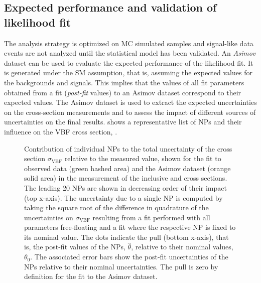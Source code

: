 \subsection{Expected performance and validation of likelihood fit}
The analysis strategy is optimized on MC simulated samples and signal-like data events are not analyzed until the statistical model has been validated.
An \emph{Asimov} dataset can be used to evaluate the expected performance of the likelihood fit. It is generated under the SM assumption, that is, assuming the expected values for the backgrounds and signals. 
This implies that the values of all fit parameters obtained from a fit (\emph{post-fit} values) to an Asimov dataset correspond to their expected values. 
The Asimov dataset is used to extract the expected uncertainties on the cross-section measurements and to assess the impact of different sources of uncertainties on the final results. 
 shows a representative list of NPs and their influence on the VBF cross section, \sigmaVBF. 
\begin{figure}[th]
    \centering
    {\caption{Contribution of individual NPs to the total uncertainty of the cross section $\sigma_{\mathrm{VBF}}$ relative to the measured value, shown for the fit to observed data (green hashed area) and the Asimov dataset (orange solid area) in the measurement of the inclusive \muVBF and \muGGF cross sections. The leading 20 NPs are shown in decreasing order of their impact (top x-axis).
    The uncertainty due to a single NP is computed by taking the square root of the difference in quadrature of the uncertainties on $\sigma_{\mathrm{VBF}}$ resulting from a fit performed with all parameters free-floating and a fit where the respective NP is fixed to its nominal value. 
    The dots indicate the pull (bottom x-axis), that is, the post-fit values of the NPs, $\hat{\theta}$, relative to their nominal values, $\theta_0$. 
    The associated error bars show the post-fit uncertainties of the NPs relative to their nominal uncertainties. 
    The pull is zero by definition for the fit to the Asimov dataset.
    \label{fig:fit:breakdown} }}
\end{figure}
